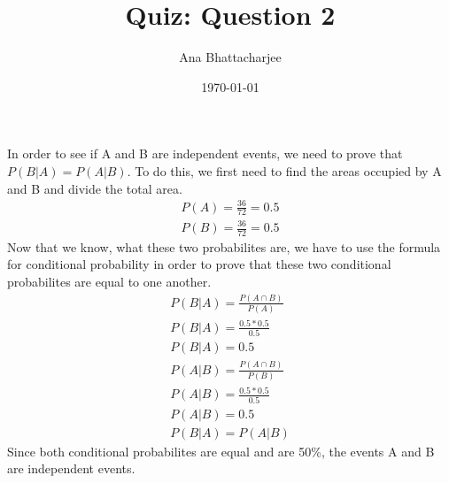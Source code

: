 \documentclass{article}
\begin{document}
\title{Quiz: Question 2}
\author{Ana Bhattacharjee}
\date{\today}
\maketitle{}

\begin{center}
In order to see if A and B are independent events, we need to prove that $P(B | A) = P(A | B)$. To do this, we first need to find the areas occupied by A and B and divide the total area.
\begin{align}
  P(A) = \frac{36}{72} = 0.5 \\
  P(B) = \frac{36}{72} = 0.5
\end{align}
Now that we know, what these two probabilites are, we have to use the formula for conditional probability in order to prove that these two conditional probabilites are equal to one another.
\begin{align}
  P(B | A) = \frac{P(A \cap B)}{P(A)} \\
  P(B | A) = \frac{0.5 * 0.5}{0.5} \\
  P(B | A) = 0.5 \\
  P(A | B) = \frac{P(A \cap B)}{P(B)} \\
  P(A | B) = \frac{0.5 * 0.5}{0.5} \\
  P(A | B) = 0.5 \\
  P(B | A) = P(A | B)
\end{align}
Since both conditional probabilites are equal and are 50\%, the events A and B are independent events. 
\end{center}
\end{document}
